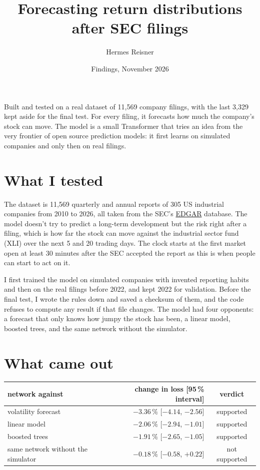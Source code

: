 \documentclass[11pt,a4paper]{article}
\title{Forecasting return distributions after SEC filings}
\author{Hermes Reisner}
\date{Findings, November 2026}
\begin{document}
\maketitle

Built and tested on a real dataset of 11,569 company filings, with the last 3,329 kept aside for the final test. For every filing, it forecasts how much the company's stock can move. The model is a small Transformer that tries an idea from the very frontier of open source prediction models: it first learns on simulated companies and only then on real filings.

\section*{What I tested}

The dataset is 11,569 quarterly and annual reports of 305 US industrial companies from 2010 to 2026, all taken from the SEC's \href{https://www.sec.gov/search-filings}{EDGAR} database. The model doesn't try to predict a long-term development but the risk right after a filing, which is how far the stock can move against the industrial sector fund (XLI) over the next 5 and 20 trading days. The clock starts at the first market open at least 30 minutes after the SEC accepted the report as this is when people can start to act on it.

I first trained the model on simulated companies with invented reporting habits and then on the real filings before 2022, and kept 2022 for validation. Before the final test, I wrote the rules down and saved a checksum of them, and the code refuses to compute any result if that file changes. The model had four opponents: a forecast that only knows how jumpy the stock has been, a linear model, boosted trees, and the same network without the simulator.

\section*{What came out}

\begin{table}[ht]
\centering
\small
\begin{tabular}{lrc}
\toprule
network against & change in loss [95\,\% interval] & verdict \\
\midrule
volatility forecast & $-3.36\,\%$ [$-4.14$, $-2.56$] & supported \\
linear model & $-2.06\,\%$ [$-2.94$, $-1.01$] & supported \\
boosted trees & $-1.91\,\%$ [$-2.65$, $-1.05$] & supported \\
same network without the simulator & $-0.18\,\%$ [$-0.58$, $+0.22$] & not supported \\
\bottomrule
\end{tabular}
\end{table}
\end{document}
